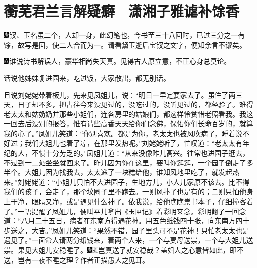 

\chapter{蘅芜君兰言解疑癖　潇湘子雅谑补馀香}

{\includegraphics[width=3mm]{../Images/00004}钗、玉名虽二个，人却一身，此幻笔也。今书至三十八回时，已过三分之一有馀，故写是回，使二人合而为一。请看黛玉逝后宝钗之文字，便知余言不谬矣。}

{\includegraphics[width=3mm]{../Images/00005}谁说诗书解误人，豪华相尚失天真。见得古人原立意，不正心身总莫论。}

话说他姊妹复进园来，吃过饭，大家散出，都无别话。

且说刘姥姥带着板儿，先来见凤姐儿，说：``明日一早定要家去了。虽住了两三天，日子却不多，把古往今来没见过的，没吃过的，没听见过的，都经验了。难得老太太和姑奶奶并那些小姐们，连各房里的姑娘们，都这样怜贫惜老照看我。我这一回去后没别的报答，惟有请些高香天天给你们念佛，保佑你们长命百岁的，就算我的心了。''凤姐儿笑道：``你别喜欢。都是为你，老太太也被风吹病了，睡着说不好过；我们大姐儿也着了凉，在那里发热呢。''刘姥姥听了，忙叹道：``老太太有年纪的人，不惯十分劳乏的。''凤姐儿道：``从来没像昨儿高兴。往常也进园子逛去，不过到一二处坐坐就回来了。昨儿因为你在这里，要叫你逛逛，一个园子倒走了多半个。大姐儿因为找我去，太太递了一块糕给他，谁知风地里吃了，就发起热来。''刘姥姥道：``小姐儿只怕不大进园子，生地方儿，小人儿家原不该去。比不得我们的孩子，会走了，那个坟圈子里不跑去。一则风扑了也是有的；二则只怕他身上干净，眼睛又净，或是遇见什么神了。依我说，给他瞧瞧祟书本子，仔细撞客着了。''一语提醒了凤姐儿，便叫平儿拿出《玉匣记》着彩明来念。彩明翻了一回念道：``八月二十五日，病者在东南方得遇花神。用五色纸钱四十张，向东南方四十步送之，大吉。''凤姐儿笑道：``果然不错，园子里头可不是花神！只怕老太太也是遇见了。''一面命人请两分纸钱来，着两个人来，一个与贾母送祟，一个与大姐儿送祟。果见大姐儿安稳睡了。{\includegraphics[width=3mm]{../Images/00004}\includegraphics[width=3mm]{../Images/00012}\footnotesize \kaishu 岂真送了就安稳哉？盖妇人之心意皆如此，即不送，岂有一夜不睡之理？作者正描愚人之见耳。}

